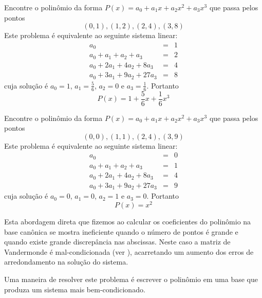 \documentclass[main.tex]{subfiles}
\begin{document}
\begin{ex} Encontre o polinômio da forma $P(x)=a_0+a_1x+a_2x^2+a_3x^3$ que passa pelos pontos
$$(0,1),(1,2),(2,4),(3,8)$$
Este problema é equivalente ao seguinte sistema linear:
\begin{eqnarray*}
a_0&=&1\\
a_0+a_1+a_2+a_3&=&2\\
a_0+2a_1+4a_2+8a_3&=&4\\
a_0+3a_1+9a_2+27a_3&=&8
\end{eqnarray*}
cuja solução é $a_0=1$, $a_1=\frac{5}{6}$, $a_2=0$ e $a_3=\frac{1}{6}$. Portanto
$$P(x)=1+\frac{5}{6}x+\frac{1}{6}x^3$$
\end{ex}

\begin{ex} Encontre o polinômio da forma $P(x)=a_0+a_1x+a_2x^2+a_3x^3$ que passa pelos pontos
$$(0,0),(1,1),(2,4),(3,9)$$
Este problema é equivalente ao seguinte sistema linear:
\begin{eqnarray*}
a_0&=&0\\
a_0+a_1+a_2+a_3&=&1\\
a_0+2a_1+4a_2+8a_3&=&4\\
a_0+3a_1+9a_2+27a_3&=&9
\end{eqnarray*}
cuja solução é $a_0=0$, $a_1=0$, $a_2=1$ e $a_3=0$. Portanto
$$P(x)=x^2$$
\end{ex}

Esta abordagem direta que fizemos ao calcular os coeficientes do polinômio na base canônica se mostra ineficiente quando o número de pontos é grande e quando existe grande discrepância nas abscissas. Neste caso a matriz de Vandermonde é mal-condicionada (ver \cite{Gautschi}), acarretando um aumento dos erros de arredondamento na solução do sistema.

Uma maneira de resolver este problema é escrever o polinômio em uma base que produza um sistema mais bem-condicionado.
\end{document}
